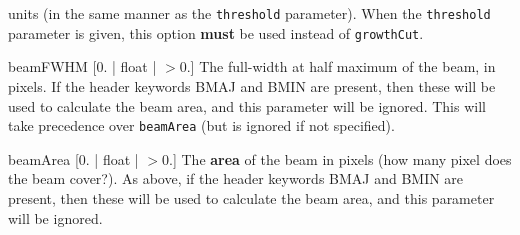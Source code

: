 \begin{Lentry}
  units (in the same manner as the \texttt{threshold} parameter). When
  the \texttt{threshold} parameter is given, this option \textbf{must}
  be used instead of \texttt{growthCut}.
\item[{beamFWHM [0. | float | $> 0.$]}] The full-width at half maximum
  of the beam, in pixels.  If the header keywords BMAJ and BMIN are
  present, then these will be used to calculate the beam area, and
  this parameter will be ignored. This will take precedence over
  \texttt{beamArea} (but is ignored if not specified).
\item[{beamArea [0. | float | $> 0.$]}] The \textbf{area} of the beam
  in pixels (\ie how many pixel does the beam cover?). As above, if
  the header keywords BMAJ and BMIN are present, then these will be
  used to calculate the beam area, and this parameter will be ignored.
\end{Lentry}

